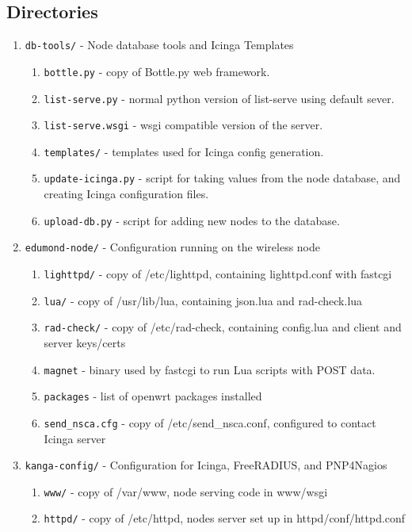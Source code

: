 \subsection{Directories}
\begin{enumerate}
\item\texttt{db-tools/} - Node database tools and Icinga Templates
\begin{enumerate}
 \item\texttt{bottle.py} - copy of Bottle.py web framework.
 \item\texttt{list-serve.py} - normal python version of list-serve using default sever.
 \item\texttt{list-serve.wsgi} - wsgi compatible version of the server.
 \item\texttt{templates/} - templates used for Icinga config generation.
 \item\texttt{update-icinga.py} - script for taking values from the node database, and creating
Icinga configuration files.
 \item\texttt{upload-db.py} - script for adding new nodes to the database.
\end{enumerate}
\item\texttt{edumond-node/} - Configuration running on the wireless node
\begin{enumerate}
 \item\texttt{lighttpd/} - copy of /etc/lighttpd, containing lighttpd.conf with fastcgi
 \item\texttt{lua/} - copy of /usr/lib/lua, containing json.lua and rad-check.lua
 \item\texttt{rad-check/} - copy of /etc/rad-check, containing config.lua and client and server keys/certs
 \item\texttt{magnet} - binary used by fastcgi to run Lua scripts with POST data.
 \item\texttt{packages} - list of openwrt packages installed
 \item\texttt{send\_nsca.cfg} - copy of /etc/send\_nsca.conf, configured to
contact Icinga server
\end{enumerate}
\item\texttt{kanga-config/} - Configuration for Icinga, FreeRADIUS, and PNP4Nagios
\begin{enumerate}
 \item\texttt{www/} - copy of /var/www, node serving code in www/wsgi
 \item\texttt{httpd/} - copy of /etc/httpd, nodes server set up in httpd/conf/httpd.conf

\end{enumerate}
\end{enumerate}
